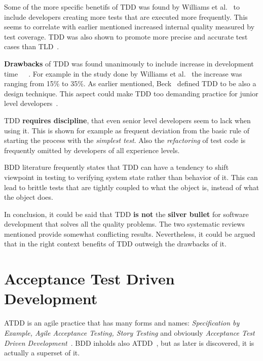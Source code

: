     Some of the more specific benetifs of TDD was found by Williams et al.~\cite{williams2009effectiveness} to include developers
    creating more tests that are executed more frequently. This seems to correlate with earlier mentioned increased internal
    quality measured by test coverage. TDD was also shown to promote more precise and accurate test cases than TLD~\cite{williams2009effectiveness}.

    \textbf{Drawbacks} of TDD was found unanimously to include increase in development time~\cite{kollanus2010test}~\cite{bissi2016effects}~\cite{williams2009effectiveness}.
    For example in the study done by Williams et al.~\cite{williams2009effectiveness} the increase was ranging from 15\% to 35\%.
    As earlier mentioned, Beck~\cite{beck2001aim} defined TDD to be also a design technique. This aspect could make TDD too demanding practice for junior
    level developers~\cite{hammond2012test}.

    TDD \textbf{requires discipline}, that even senior level developers seem to lack when using it. This is shown for example as
    frequent deviation from the basic rule of starting the process with the \textit{simplest test}. Also the \textit{refactoring}
    of test code is frequently omitted by developers of all experience levels. ~\cite{aniche2010most}

    BDD literature frequently states that TDD can have a tendency to shift viewpoint in testing to verifying system state
    rather than behavior of it. This can lead to brittle tests that are tightly coupled to what the object is, instead of
    what the object does. ~\cite{chelimsky2010rspec}~\cite{astels2006new}~\cite{amodeo2015learning}

    In conclusion, it could be said that TDD \textbf{is not} the \textbf{silver bullet} for software development that solves all the quality problems.
    The two systematic reviews mentioned provide somewhat conflicting results. Nevertheless, it could be argued that in the right
    context benefits of TDD outweigh the drawbacks of it.

\section{Acceptance Test Driven Development}
    ATDD is an agile practice that has many forms and names: \textit{Specification by Example, Agile Acceptance Testing, Story Testing} and
    obviously \textit{Acceptance Test Driven Development}~\cite{gartner2012atdd}. BDD inholds also
    ATDD~\cite{gartner2012atdd}, but as later is discovered, it is actually a superset of it.

